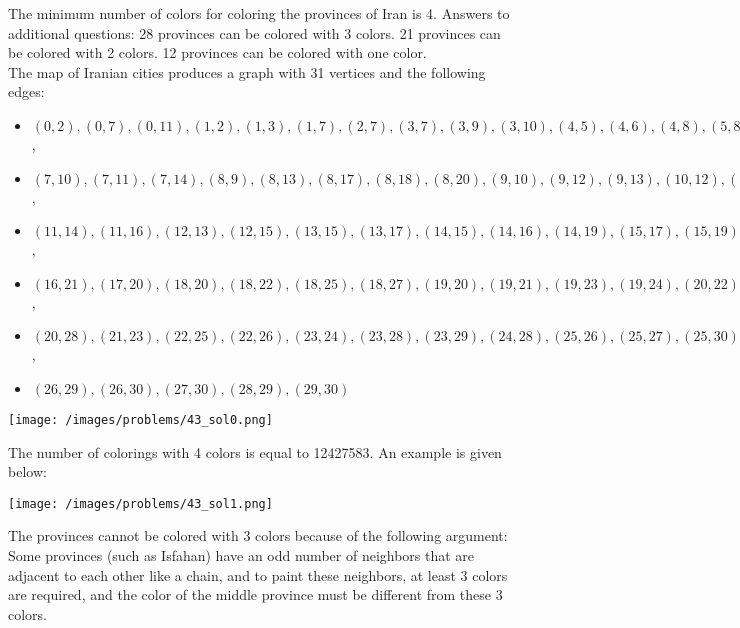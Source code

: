 \begin{solution}
The minimum number of colors for coloring the provinces of Iran is 4. Answers to additional questions: 28 provinces can be colored with 3 colors. 21 provinces can be colored with 2 colors. 12 provinces can be colored with one color. \\[0.2cm]

The map of Iranian cities produces a graph with 31 vertices and the following edges:

\begin{itemize}
	\item $(0, 2), (0, 7), (0, 11), (1, 2), (1, 3), (1, 7), (2, 7), (3, 7), ( 3, 9), (3, 10), (4, 5), (4, 6), (4, 8), (5, 8), (5, 9), (6, 8), (6, 18)$,
	\item $(7, 10), (7, 11), (7, 14), (8, 9), (8, 13), (8, 17), (8, 18), (8, 20) , (9, 10), (9, 12), (9, 13), (10, 12), (10, 14), (10, 15)$, 
	\item $ (11, 14), (11, 16), ( 12, 13), (12, 15), (13, 15), (13, 17), (14, 15), (14, 16), (14, 19), (15, 17), (15, 19), (15, 20), (16, 19)$,
	\item $(16, 21), (17, 20), (18, 20), (18, 22), (18, 25), (18, 27) , (19, 20), (19, 21), (19, 23), (19, 24),(20, 22), (20, 24), (20, 26)$,
	\item $(20, 28), ( 21, 23), (22, 25), (22, 26), (23, 24), (23, 28), (23, 29), (24, 28), (25, 26), (25, 27), (25, 30), (26, 28)$,
	\item $(26, 29), (26, 30), (27, 30), (28, 29), (29, 30)$
\end{itemize}  

\begin{center}
	\texttt{[image: /images/problems/43\_sol0.png]}
\end{center}

The number of colorings with 4 colors is equal to 12427583. An example is given below:

\begin{center}
	\texttt{[image: /images/problems/43\_sol1.png]}
\end{center}

The provinces cannot be colored with 3 colors because of the following argument: Some provinces (such as Isfahan) have an odd number of neighbors that are adjacent to each other like a chain, and to paint these neighbors, at least 3 colors are required, and the color of the middle province must be different from these 3 colors.\\[0.2cm]


\end{solution}
